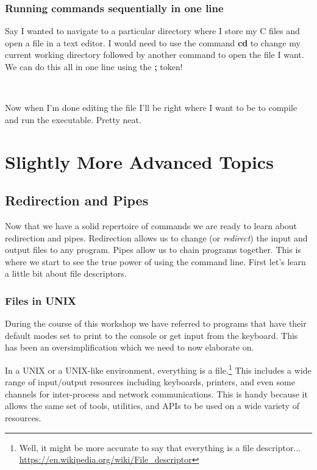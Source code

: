 \documentclass[oneside]{book}
\newcommand{\commandline}[1]{\begin{center} \colorbox{Dark}{\textcolor{white}{#1}} \end{center}}
\begin{document}
\subsection{Running commands sequentially in one line}
Say I wanted to navigate to a particular directory where I store my C files and open a file in a text editor. I would need to use the command \textbf{cd} to change my current working directory followed by another command to open the file I want. We can do this all in one line using the \textbf{;} token!
\commandline{cd demo/c\_programs ; vim HelloWorld.c}

Now when I'm done editing the file I'll be right where I want to be to compile and run the executable. Pretty neat.



\newpage

\chapter{Slightly More Advanced Topics}

\section{Redirection and Pipes}
    Now that we have a solid repertoire of commands we are ready to learn about redirection and pipes. Redirection allows us to change (or \textit{redirect}) the input and output files to any program. Pipes allow us to chain programs together. This is where we start to see the true power of using the command line. First let's learn a little bit about file descriptors. 
    
    \subsection{Files in UNIX}
    \label{sec:files_in_unix}
    During the course of this workshop we have referred to programs that have their default modes set to print to the console or get input from the keyboard. This has been an oversimplification which we need to now elaborate on.
        
    In a UNIX or a UNIX-like environment, everything is a file.\footnote{Well, it might be more accurate to say that everything is a file descriptor... \url{https://en.wikipedia.org/wiki/File_descriptor}} This includes a wide range of input/output resources including keyboards, printers, and even some channels for inter-process and network communications. This is handy because it allows the same set of tools, utilities, and APIs to be used on a wide variety of resources.
    
\end{document}
